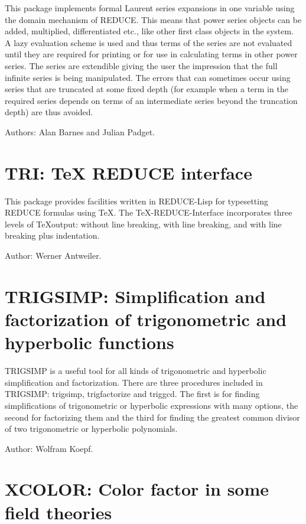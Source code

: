 This package implements formal Laurent series expansions in one variable
using the domain mechanism of REDUCE.  This means that power series
objects can be added, multiplied, differentiated etc.,  like other first
class objects in the system.  A lazy evaluation scheme is used and thus
terms of the series are not evaluated until they are required for printing
or for use in calculating terms in other power series.  The series are
extendible giving the user the impression that the full infinite series is
being manipulated.  The errors that can sometimes occur using series that
are truncated at some fixed depth (for example when a term in the required
series depends on terms of an intermediate series beyond the truncation
depth) are thus avoided.

Authors:  Alan Barnes and Julian Padget.

\section{TRI: TeX REDUCE interface} 

This package provides facilities written in REDUCE-Lisp for typesetting
REDUCE formulas using \TeX.  The \TeX-REDUCE-Interface incorporates three
levels of \TeX output: without line breaking, with line breaking, and
with line breaking plus indentation.

Author: Werner Antweiler.

\section{TRIGSIMP: Simplification and factorization of trigonometric
and hyperbolic functions} 

TRIGSIMP is a useful tool for all kinds of trigonometric and hyperbolic
simplification and factorization.  There are three procedures included in
TRIGSIMP: trigsimp, trigfactorize and triggcd.  The first is for finding
simplifications of trigonometric or hyperbolic expressions with many
options, the second for factorizing them and the third for finding the
greatest common divisor of two trigonometric or hyperbolic polynomials.

Author: Wolfram Koepf.

\section{XCOLOR: Color factor in some field theories}

